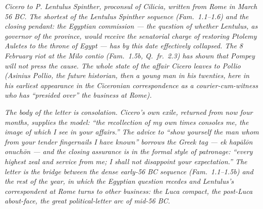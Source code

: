 
\textit{Cicero to P. Lentulus Spinther, proconsul of Cilicia,
written from Rome in March 56 BC. The shortest of the Lentulus
Spinther sequence (Fam.\ 1.1--1.6) and the closing pendant: the
Egyptian commission --- the question of whether Lentulus, as
governor of the province, would receive the senatorial charge
of restoring Ptolemy Auletes to the throne of Egypt --- has by
this date effectively collapsed. The 8 February riot at the
Milo contio (Fam.\ 1.5b, Q.\ fr.\ 2.3) has shown that Pompey
will not press the cause. The whole state of the affair Cicero
leaves to Pollio (Asinius Pollio, the future historian, then a
young man in his twenties, here in his earliest appearance in
the Ciceronian correspondence as a courier-cum-witness who has
``presided over'' the business at Rome).}

\textit{The body of the letter is consolation. Cicero's own
exile, returned from now four months, supplies the model: ``the
recollection of my own times consoles me, the image of which I
see in your affairs.'' The advice to ``show yourself the man
whom from your tender fingernails I have known'' borrows the
Greek tag --- \textit{ek hap\=al\=on onuch\=on} --- and the
closing assurance is in the formal style of patronage:
``every highest zeal and service from me; I shall not
disappoint your expectation.'' The letter is the bridge between
the dense early-56 BC sequence (Fam.\ 1.1--1.5b) and the rest of
the year, in which the Egyptian question recedes and Lentulus's
correspondent at Rome turns to other business: the Luca
compact, the post-Luca about-face, the great political-letter
arc of mid-56 BC.}
